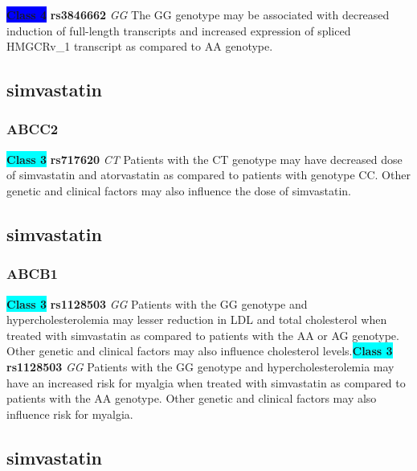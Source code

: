\documentclass{book}
\begin{document}
\begin{center}

\textbf{\colorbox{blue} {Class 4}} \textbf{ rs3846662 } \textit{ GG }
The GG genotype may be associated with decreased induction of full-length transcripts and increased expression of spliced HMGCRv_1 transcript  as compared to AA genotype.

\end{center}\subsection{ simvastatin }


\subsubsection{ ABCC2 }

\begin{center}
\textbf{\colorbox{cyan} {Class 3}} \textbf{ rs717620 } \textit{ CT }
Patients with the CT genotype may have decreased dose of simvastatin and atorvastatin as compared to patients with genotype CC. Other genetic and clinical factors may also influence the dose of simvastatin.


\end{center}\subsection{ simvastatin }


\subsubsection{ ABCB1 }

\begin{center}
\textbf{\colorbox{cyan} {Class 3}} \textbf{ rs1128503 } \textit{ GG }
Patients with the GG genotype and hypercholesterolemia may lesser reduction in LDL and total cholesterol when treated with simvastatin as compared to patients with the AA or AG genotype. Other genetic and clinical factors may also influence cholesterol levels.\textbf{\colorbox{cyan} {Class 3}} \textbf{ rs1128503 } \textit{ GG }
Patients with the GG genotype and hypercholesterolemia may have an increased risk for myalgia when treated with simvastatin as compared to patients with the AA genotype. Other genetic and clinical factors may also influence risk for myalgia.


\end{center}\subsection{ simvastatin }
\end{document}
